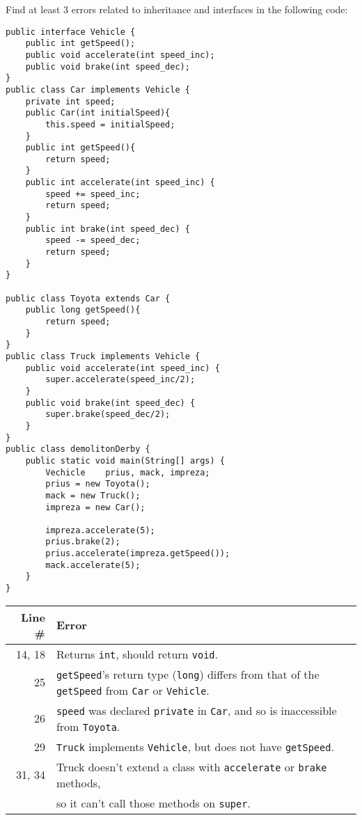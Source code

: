 %
%


Find at least 3 errors related to inheritance and interfaces in the following code:\label{demolition-derby}
\begin{lstlisting}
public interface Vehicle {
	public int getSpeed();
	public void accelerate(int speed_inc);
	public void brake(int speed_dec);
}
public class Car implements Vehicle {
	private int speed;
	public Car(int initialSpeed){
		this.speed = initialSpeed;
	}
	public int getSpeed(){
		return speed;
	}
	public int accelerate(int speed_inc) {
		speed += speed_inc;
		return speed;
	}
	public int brake(int speed_dec) {
		speed -= speed_dec;
		return speed;
	}
}

public class Toyota extends Car {
	public long getSpeed(){
		return speed;
	}
}
public class Truck implements Vehicle {
	public void accelerate(int speed_inc) {
		super.accelerate(speed_inc/2);
	}
	public void brake(int speed_dec) {
		super.brake(speed_dec/2);
	}
}
public class demolitonDerby {
	public static void main(String[] args) {
		Vechicle	prius, mack, impreza;
		prius = new Toyota();
		mack = new Truck();
		impreza = new Car();
		
		impreza.accelerate(5);
		prius.brake(2);
		prius.accelerate(impreza.getSpeed());
		mack.accelerate(5);
	}
}
\end{lstlisting}

\begin{answer}
    \begin{tabular}{r l} 
    Line \# & Error \\\hline
    14, 18  	& Returns {\tt int}, should return {\tt void}.\\
    25  	& {\tt getSpeed}'s return type ({\tt long}) differs from that of the {\tt getSpeed} from {\tt Car} or {\tt Vehicle}.\\
    26  	& {\tt speed} was declared {\tt private} in {\tt Car}, and so is inaccessible from {\tt Toyota}.\\
    29  	& {\tt Truck} implements {\tt Vehicle}, but does not have {\tt getSpeed}.\\
    31, 34  	& Truck doesn't extend a class with {\tt accelerate} or {\tt brake} methods,\\
    		& so it can't call those methods on {\tt super}.\\
    \end{tabular}
\end{answer}
